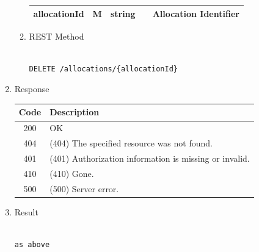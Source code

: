 \begin{enumerate}
\begin{enumerate}
\begin{table}[H]
\begin{center}
\begin{tabular}{|p{3cm}|l|p{3cm}|p{3cm}|p{4cm}|}
allocationId			& M	& 	string	&								&	Allocation Identifier \\ 
\hline

\end{tabular}
\end{center}
\end{table}

\item REST Method

\begin{tcolorbox}[boxrule=0pt, frame empty]
\begin{verbatim} 

DELETE /allocations/{allocationId}

\end{verbatim}
\end{tcolorbox}

\end{enumerate}

\item Response

\begin{table}[H]
\footnotesize

\begin{center}
\begin{tabular}{|c|l|} 
\hline
\rowcolor{lightgray}	Code 		& 	Description \\
\hline
200	 		&	OK \\
\hline
404			&	(404) The specified resource was not found. \\
\hline
401			&	(401) Authorization information is missing or invalid. \\
\hline
410			&	(410) Gone. \\
\hline
500			&	(500) Server error. \\
\hline
\end{tabular}
\end{center}

\end{table}

\item Result

\begin{tcolorbox}[boxrule=0pt, frame empty]
\begin{verbatim}

as above

\end{verbatim}
\end{tcolorbox}



\end{enumerate}
